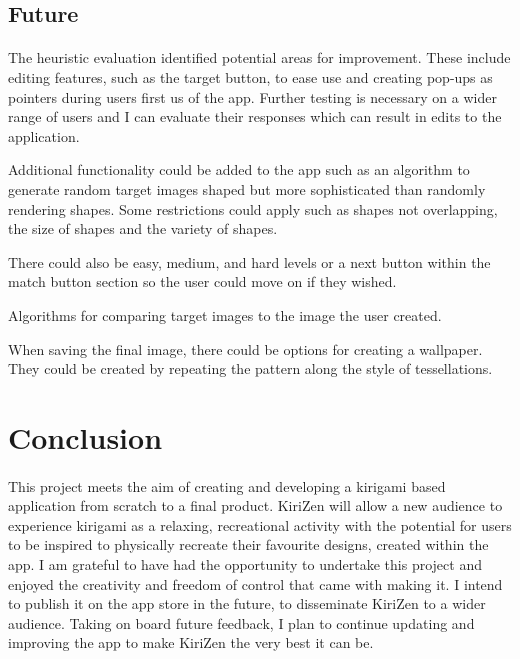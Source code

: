 \documentclass[11pt]{article}
\begin{document}
    \subsection{Future}
                \paragraph{}
                
                The heuristic evaluation identified potential areas for improvement. These include editing features, such as the target button, to ease use and creating pop-ups as pointers during users first us of the app. Further testing is necessary on a wider range of users and I can evaluate their responses which can result in edits to the application. 
                
                Additional functionality could be added to the app such as an algorithm to generate random target images shaped but more sophisticated than randomly rendering shapes. Some restrictions could apply such as shapes not overlapping, the size of shapes and the variety of shapes.
                
                There could also be easy, medium, and hard levels or a next button within the match button section so the user could move on if they wished. 
                
                Algorithms for comparing target images to the image the user created.

                When saving the final image, there could be options for creating a wallpaper. They could be created by repeating the pattern
                along the style of tessellations. 

\newpage
\section{Conclusion}
        
            \paragraph{}
            This project meets the aim of creating and developing a kirigami based application from scratch to a final product. KiriZen will allow a new audience to experience kirigami as a relaxing, recreational activity with the potential for users to be inspired to physically recreate their favourite designs, created within the app. I am grateful to have had the opportunity to undertake this project and enjoyed the creativity and freedom of control that came with making it. I intend to publish it on the app store in the future, to disseminate KiriZen to a wider audience. Taking on board future feedback, I plan to continue updating and improving the app to make KiriZen the very best it can be.
\end{document}
